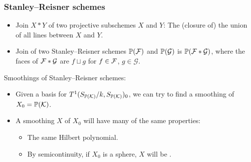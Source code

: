 \begin{frame}
\frametitle{Stanley--Reisner schemes}

\begin{itemize}
	\item
	\alert{Join} $X \ast Y$ of two projective subschemes $X$ and $Y$: The (closure of) the union of all lines between $X$ and $Y$.
	\pause

	\item
	\alert{Join} of two Stanley--Reisner schemes $\P(\F)$ and $\P(\mathcal G)$ is $\P(\F \ast \mathcal G)$, where the faces of $\F  \ast \mathcal G$ are $f \sqcup g$ for $f \in \F$, $g \in \mathcal G$.
\end{itemize}

\pause

Smoothings of Stanley--Reisner schemes:

\begin{itemize}
	\item Given a basis for $T^1(S_{\P(\K)}/k,S_{\P(\K)})_0$, we can try to find a smoothing of $X_0 = \P(\K)$.
	\pause
	\item A smoothing $X$ of $X_0$ will have many of the same properties:
		\begin{itemize}
			\item The same Hilbert polynomial.
			\item By semicontinuity, if $X_0$ is a sphere, $X$ will be \CY. %
		\end{itemize}
\end{itemize}


\end{frame}